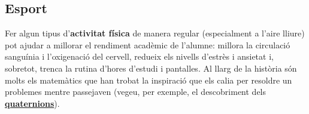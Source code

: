 \documentclass[a4paper, 12pt]{article}
\begin{document}
        \subsection*{Esport}

            Fer algun tipus d'\textbf{activitat física} de manera regular (especialment a l'aire lliure) pot ajudar a millorar el rendiment acadèmic de l'alumne: millora la circulació sanguínia i l'oxigenació del cervell, redueix els nivells d'estrès i ansietat i, sobretot, trenca la rutina d'hores d'estudi i pantalles. Al llarg de la història són molts els matemàtics que han trobat la inspiració que els calia per resoldre un problemes mentre passejaven (vegeu, per exemple, el descobriment dels \href{https://en.wikipedia.org/wiki/Hamilton_Walk}{\textbf{quaternions}}).
\end{document}
